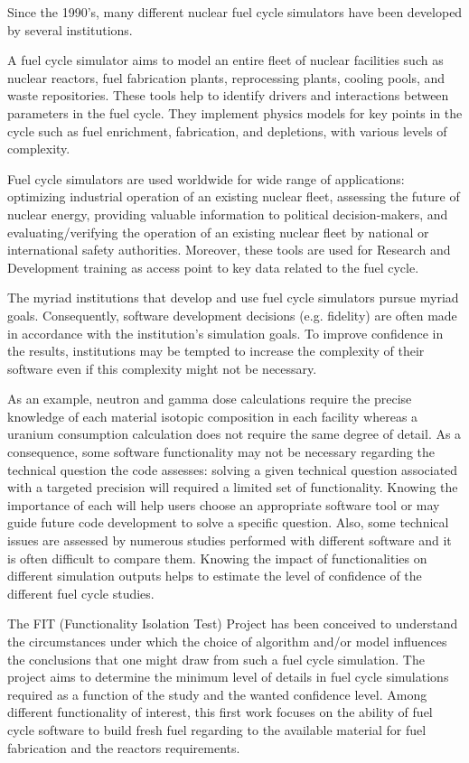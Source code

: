 Since the 1990's, many different nuclear fuel cycle simulators have been
developed by several institutions.

A fuel cycle simulator aims to model an entire fleet of nuclear 
facilities such as nuclear reactors, fuel fabrication plants, reprocessing
plants, cooling pools, and waste repositories. These tools help to identify drivers
and interactions between parameters in the fuel cycle. They implement physics models
for key points in the cycle such as fuel enrichment, fabrication, and
depletions, with various levels of complexity. 

Fuel cycle simulators are used worldwide for wide range of applications:
optimizing industrial operation of an existing nuclear fleet, assessing
the future of nuclear energy, providing valuable information to political 
decision-makers, and evaluating/verifying the operation of an existing
nuclear fleet by national or international safety authorities. Moreover, these
tools are used for Research and Development training as access point to key
data related to the fuel cycle.

The myriad institutions that develop and use fuel cycle simulators pursue myriad
goals. Consequently, software development decisions (e.g. fidelity) are often 
made in accordance with the institution's simulation goals. To improve
confidence in the results, institutions may be tempted to increase the complexity
of their software even if this complexity might not be necessary.

As an example, neutron and gamma dose calculations require the precise
knowledge of each material isotopic composition in each facility whereas a
uranium consumption calculation does not require the same degree of detail. As a
consequence, some software functionality may not be necessary regarding the
technical question the code assesses: solving a given technical question
associated with a targeted precision will required a limited set of
functionality. Knowing the importance of each will help users choose an
appropriate software tool or may guide future code development to solve a specific
question. Also, some technical issues are assessed by numerous studies performed
with different software and it is often difficult to compare them. Knowing the
impact of functionalities on different simulation outputs helps to estimate the
level of confidence of the different fuel cycle studies.

The FIT (Functionality Isolation Test) Project has been conceived to understand
the circumstances under which the choice of algorithm and/or model influences
the conclusions that one might draw from such a fuel cycle simulation. The
project aims to determine the minimum level of details in fuel cycle simulations
required as a function of the study and the wanted confidence level. Among
different functionality of interest, this first work focuses on the ability of
fuel cycle software to build fresh fuel regarding to the available material for
fuel fabrication and the reactors requirements.

